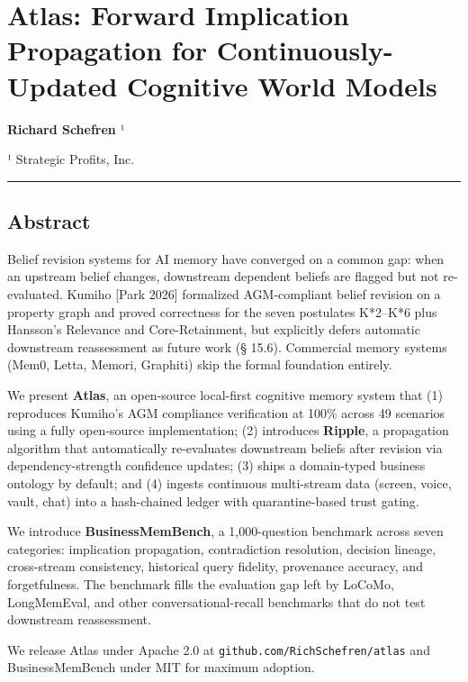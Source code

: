 \documentclass[
  11pt,
]{article}
\author{}
\date{}
\begin{document}
\section{Atlas: Forward Implication Propagation for Continuously-Updated
Cognitive World
Models}\label{atlas-forward-implication-propagation-for-continuously-updated-cognitive-world-models}

\textbf{Richard Schefren} ¹

¹ Strategic Profits, Inc.

\begin{center}\rule{0.5\linewidth}{0.5pt}\end{center}

\subsection{Abstract}\label{abstract}

Belief revision systems for AI memory have converged on a common gap:
when an upstream belief changes, downstream dependent beliefs are
flagged but not re-evaluated. Kumiho {[}Park 2026{]} formalized
AGM-compliant belief revision on a property graph and proved correctness
for the seven postulates K*2--K*6 plus Hansson's Relevance and
Core-Retainment, but explicitly defers automatic downstream reassessment
as future work (§ 15.6). Commercial memory systems (Mem0, Letta, Memori,
Graphiti) skip the formal foundation entirely.

We present \textbf{Atlas}, an open-source local-first cognitive memory
system that (1) reproduces Kumiho's AGM compliance verification at 100\%
across 49 scenarios using a fully open-source implementation; (2)
introduces \textbf{Ripple}, a propagation algorithm that automatically
re-evaluates downstream beliefs after revision via dependency-strength
confidence updates; (3) ships a domain-typed business ontology by
default; and (4) ingests continuous multi-stream data (screen, voice,
vault, chat) into a hash-chained ledger with quarantine-based trust
gating.

We introduce \textbf{BusinessMemBench}, a 1,000-question benchmark
across seven categories: implication propagation, contradiction
resolution, decision lineage, cross-stream consistency, historical query
fidelity, provenance accuracy, and forgetfulness. The benchmark fills
the evaluation gap left by LoCoMo, LongMemEval, and other
conversational-recall benchmarks that do not test downstream
reassessment.

We release Atlas under Apache 2.0 at
\texttt{github.com/RichSchefren/atlas} and BusinessMemBench under MIT
for maximum adoption.
\end{document}
